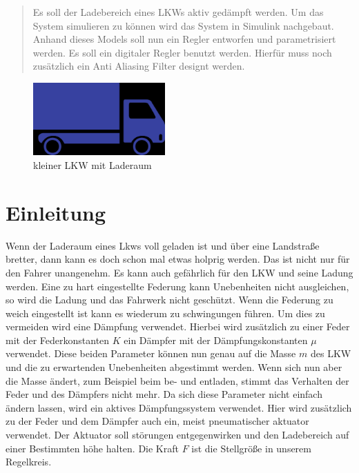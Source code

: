 
\begin{abstract} %
	Es soll der Ladebereich eines LKWs aktiv gedämpft werden. Um das System simulieren zu können wird das System in Simulink nachgebaut. Anhand dieses Models soll nun 
	ein Regler entworfen und parametrisiert werden. Es soll ein digitaler Regler benutzt werden. 
	Hierfür muss noch zusätzlich ein Anti Aliasing Filter designt werden.
\end{abstract}

\begin{figure}[h] 
	\centering
		\includegraphics[width=0.45\textwidth]{Bilder/truckIcon.jpg}
	\caption{kleiner LKW mit Laderaum}
	\label{SimulinkStreckenModell}
\end{figure}

\section{Einleitung}
Wenn der Laderaum eines Lkws voll geladen ist und über eine Landstraße bretter, dann kann es doch schon mal etwas holprig werden. Das ist nicht nur für den Fahrer unangenehm. Es kann auch gefährlich für den LKW und seine Ladung werden.
Eine zu hart eingestellte Federung kann Unebenheiten nicht ausgleichen, so wird die Ladung und das Fahrwerk nicht geschützt. Wenn die Federung zu weich eingestellt ist kann es 
wiederum zu schwingungen führen. Um dies zu vermeiden wird eine Dämpfung verwendet. Hierbei wird zusätzlich zu einer Feder mit der Federkonstanten $K$ ein Dämpfer mit der Dämpfungskonstanten $\mu$ verwendet. 
Diese beiden Parameter können nun genau auf die Masse $m$ des LKW und die zu erwartenden Unebenheiten abgestimmt werden. 
Wenn sich nun aber die Masse ändert, zum Beispiel beim be- und entladen, stimmt das Verhalten der Feder und des Dämpfers nicht mehr.
Da sich diese Parameter nicht einfach ändern lassen, wird ein aktives Dämpfungssystem verwendet. Hier wird zusätzlich zu der Feder und dem Dämpfer 
auch ein, meist pneumatischer aktuator verwendet. Der Aktuator soll störungen entgegenwirken und den Ladebereich auf einer Bestimmten höhe halten.
Die Kraft $F$ ist die Stellgröße in unserem Regelkreis.
	
